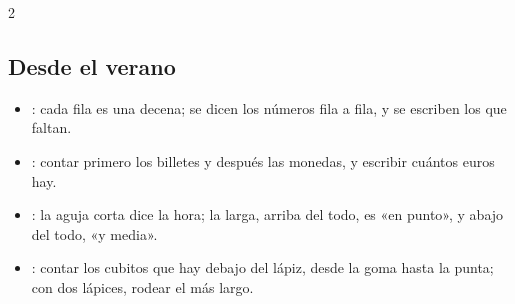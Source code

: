 {\begin{multicols}{2}
\subsection*{Desde el verano}
\begin{itemize}[leftmargin=5mm, itemsep=1pt, topsep=0pt]
\item \textbf{\lblTabla}: cada fila es una decena; se dicen los números
  fila a fila, y se escriben los que faltan.
\item \textbf{\lblDinero}: contar primero los billetes y después las
  monedas, y escribir cuántos euros hay.
\item \textbf{\lblHora}: la aguja corta dice la hora; la larga, arriba
  del todo, es «en punto», y abajo del todo, «y media».
\item \textbf{\lblMide}: contar los cubitos que hay debajo del lápiz,
  desde la goma hasta la punta; con dos lápices, rodear el más largo.
\end{itemize}
\end{multicols}}
\newpage
